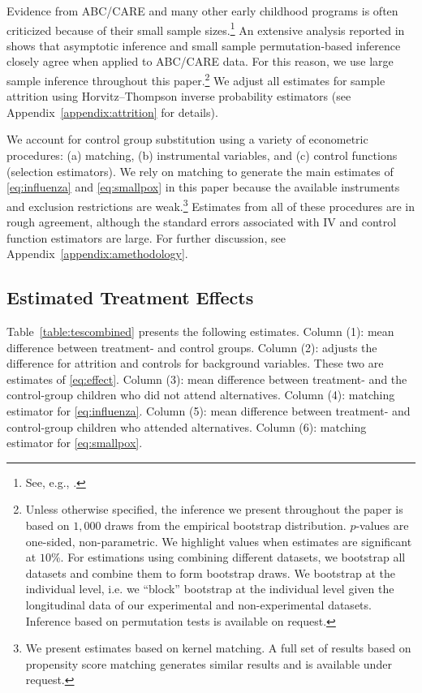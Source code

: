 Evidence from ABC/CARE and many other early childhood programs is often criticized because of their small sample sizes.\footnote{See, e.g., \cite{Murray_2013_GivingKids_JJHBOOK}.} An extensive analysis reported in \citet{Campbell_Conti_etal_2014_EarlyChildhoodInvestments} shows that asymptotic inference and small sample permutation-based inference closely agree when applied to ABC/CARE data. For this reason, we use large sample inference throughout this paper.\footnote{Unless otherwise specified, the inference we present throughout the paper is based on $1,000$ draws from the empirical bootstrap distribution. $p$-values are one-sided, non-parametric. We highlight values when estimates are significant at $10\%$. For estimations using combining different datasets, we bootstrap all datasets and combine them to form bootstrap draws. We bootstrap at the individual level, i.e. we ``block'' bootstrap at the individual level given the longitudinal data of our experimental and non-experimental datasets. Inference based on permutation tests is available on request.} We adjust all estimates for sample attrition using Horvitz--Thompson \citeyearpar{Horvitz_Thompson_1952_JASA} inverse probability estimators (see Appendix~\ref{appendix:attrition} for details).

We account for control group substitution using a variety of econometric procedures: (a) matching, (b) instrumental variables, and (c) control functions (selection estimators). We rely on matching to generate the main estimates of \eqref{eq:influenza} and \eqref{eq:smallpox} in this paper because the available instruments and exclusion restrictions are weak.\footnote{We present estimates based on kernel matching. A full set of results based on propensity score matching generates similar results and is available under request.} Estimates from all of these procedures are in rough agreement, although the standard errors associated with IV and control function estimators are large. For further discussion, see Appendix~\ref{appendix:amethodology}.

\subsection{Estimated Treatment Effects}

Table~\ref{table:tescombined} presents the following estimates. Column (1): mean difference between treatment- and control groups. Column (2): adjusts the difference for attrition and controls for background variables. These two are estimates of \eqref{eq:effect}. Column (3): mean difference between treatment- and the control-group children who did not attend alternatives. Column (4): matching estimator for  \eqref{eq:influenza}. Column (5):  mean difference between treatment- and control-group children who attended alternatives. Column (6): matching estimator for \eqref{eq:smallpox}.

